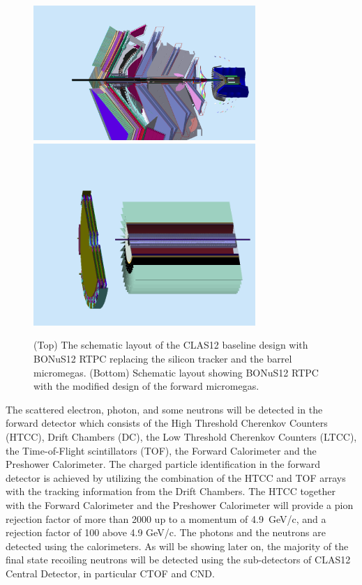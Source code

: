 \begin{figure}
  \begin{center}
    \includegraphics[angle=0, width=0.75\textwidth]{figures/clas12_bonus12.png}
    \includegraphics[angle=0, width=0.75\textwidth,clip, trim = 0mm 10mm 0mm 
     40mm]{figures/bonus12_fmt.png}
     \caption{(Top) The schematic layout of the CLAS12 baseline design with 
     BONuS12 RTPC replacing the silicon tracker and the barrel micromegas.  
     (Bottom) Schematic layout showing BONuS12 RTPC with the modified design of 
     the forward micromegas.}
    \label{fig:fd}
  \end{center}
\end{figure}


The scattered electron, photon, and some neutrons will be detected in the 
forward detector which consists of the High Threshold Cherenkov Counters 
(HTCC), Drift Chambers (DC), the Low Threshold Cherenkov Counters (LTCC), the 
Time-of-Flight scintillators (TOF), the Forward Calorimeter and the Preshower 
Calorimeter. The charged particle identification in the forward detector is 
achieved by utilizing the combination of the HTCC and TOF arrays with the 
tracking information from the Drift Chambers. The HTCC together with the 
Forward Calorimeter and the Preshower Calorimeter will provide a pion rejection 
factor of more than 2000 up to a momentum of 4.9~GeV/c, and a rejection factor 
of 100 above 4.9 GeV/c. The photons and the neutrons are detected using the 
calorimeters. As will be showing later on, the majority of the final state 
recoiling neutrons will be detected using the sub-detectors of CLAS12 Central 
Detector, in particular CTOF and CND. 

